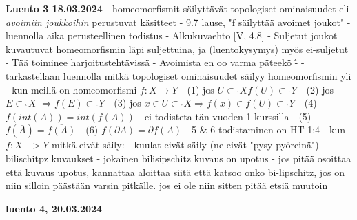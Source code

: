 \documentclass[12pt,a4paper,leqno]{amsart}
\newcommand{\css}{\operatorname{\subset\!\!\!\!_{^{^c}}}}
\newcommand{\oss}{\operatorname{\subset\!\!\!\!_{^{^\circ}}}}
\begin{document}
\textbf{Luento 3 18.03.2024} %
- homeomorfismit säilyttävät topologiset ominaisuudet eli \textit{avoimiin joukkoihin} perustuvat käsitteet
- 9.7 lause,  "f säilyttää avoimet joukot"
    - luennolla aika perusteellinen todistus
    - Alkukuvaehto [V, 4.8]
    - Suljetut joukot kuvautuvat homeomorfismin läpi suljettuina, ja (luentokysymys) myös ei-suljetut
        - Tää toiminee harjoitustehtävissä
    - Avoimista en oo varma päteekö \^
    -
- tarkastellaan luennolla mitkä topologiset ominaisuudet säilyy homeomorfismin yli
  - kun meillä on homeomorfismi $f: X \rightarrow Y$
  - (1) jos $U \oss X f(U) \oss Y$
  - (2) jos $E \css X$ $\Rightarrow f(E) \css Y$ 
  - (3) jos $x \in U \oss X \Rightarrow f(x) \in f(U) \oss Y$
  - (4) $f(int(A)) = int(f(A))$
    - ei todisteta tän vuoden 1-kurssilla
  - (5) $f(\overline{A}) = \overline{f(A)}$
  - (6) $f (\partial A) = \partial f(A)$
    - 5 \& 6 todistaminen on HT 1:4
  - kun $f: X -> Y$ mitkä eivät säily:
    - kuulat eivät säily (ne eivät "pysy pyöreinä")
    - 
- bilischitpz kuvaukset
  - jokainen bilisipschitz kuvaus on upotus
  - jos pitää osoittaa että kuvaus upotus, kannattaa aloittaa siitä että katsoo onko bi-lipschitz, jos on niin silloin päästään varsin pitkälle. jos ei ole niin sitten pitää etsiä muutoin


\textbf{luento 4, 20.03.2024}
\end{document}
